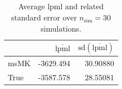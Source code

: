 \begin{table}[H]

\caption{Average lpml and related standard error over $n_{\text{sim}} = 30$ simulations.}
\centering
\begin{tabular}[t]{lrr}
\toprule
  & $\overbar{\text{lpml}}$ & $\text{sd}(\overbar{\text{lpml}})$\\
\midrule
msMK & -3629.494 & 30.90880\\
True & -3587.578 & 28.55081\\
\bottomrule
\end{tabular}
\end{table}